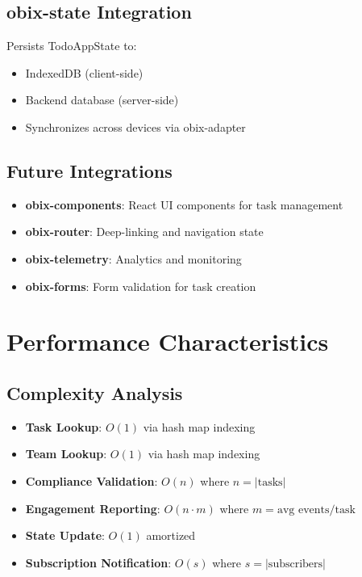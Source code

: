 \documentclass[12pt,a4paper]{article}
\begin{document}
\subsection{obix-state Integration}

Persists TodoAppState to:
\begin{itemize}
  \item IndexedDB (client-side)
  \item Backend database (server-side)
  \item Synchronizes across devices via obix-adapter
\end{itemize}

\subsection{Future Integrations}

\begin{itemize}
  \item \textbf{obix-components}: React UI components for task management
  \item \textbf{obix-router}: Deep-linking and navigation state
  \item \textbf{obix-telemetry}: Analytics and monitoring
  \item \textbf{obix-forms}: Form validation for task creation
\end{itemize}

\section{Performance Characteristics}

\subsection{Complexity Analysis}

\begin{itemize}
  \item \textbf{Task Lookup}: $O(1)$ via hash map indexing
  \item \textbf{Team Lookup}: $O(1)$ via hash map indexing
  \item \textbf{Compliance Validation}: $O(n)$ where $n = |\text{tasks}|$
  \item \textbf{Engagement Reporting}: $O(n \cdot m)$ where $m = \text{avg events/task}$
  \item \textbf{State Update}: $O(1)$ amortized
  \item \textbf{Subscription Notification}: $O(s)$ where $s = |\text{subscribers}|$
\end{itemize}
\end{document}
